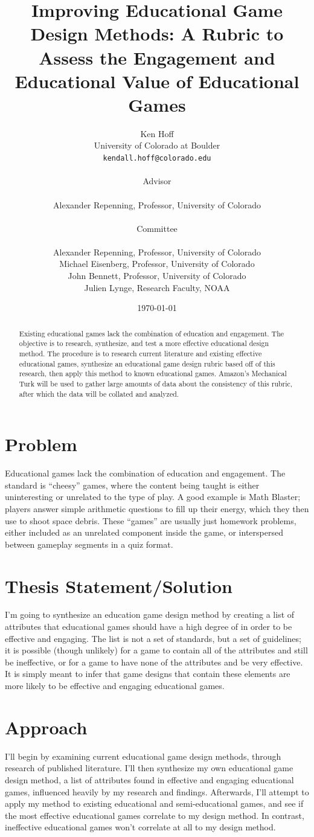 \documentclass[12pt]{report}
\author{Ken Hoff \\ University of Colorado at Boulder \\ \texttt{kendall.hoff@colorado.edu} 
\\ \\ Advisor \\	\\ Alexander Repenning, Professor, University of Colorado 
\\ \\ Committee \\	\\ Alexander Repenning, Professor, University of Colorado
					\\ Michael Eisenberg, Professor, University of Colorado
					\\ John Bennett, Professor, University of Colorado
					\\ Julien Lynge, Research Faculty, NOAA}
\date{\today}
\title{Improving Educational Game Design Methods: A Rubric to Assess the Engagement and Educational Value of Educational Games
}
\begin{document}
\maketitle

\begin{abstract}

Existing educational games lack the combination of education and engagement. The objective is to research, synthesize, and test a more effective educational design method. The procedure is to research current literature and existing effective educational games, synthesize an educational game design rubric based off of this research, then apply this method to known educational games. Amazon's Mechanical Turk will be used to gather large amounts of data about the consistency of this rubric, after which the data will be collated and analyzed.

\end{abstract}

\tableofcontents

\section{Problem}
	Educational games lack the combination of education and engagement. The standard is “cheesy” games, where the content being taught is either uninteresting or unrelated to the type of play. A good example is Math Blaster; players answer simple arithmetic questions to fill up their energy, which they then use to shoot space debris. These “games” are usually just homework problems, either included as an unrelated component inside the game, or interspersed between gameplay segments in a quiz format.

\section{Thesis Statement/Solution}
	I'm going to synthesize an education game design method by creating a list of attributes that educational games should have a high degree of in order to be effective and engaging. The list is not a set of standards, but a set of guidelines; it is possible (though unlikely) for a game to contain all of the attributes and still be ineffective, or for a game to have none of the attributes and be very effective. It is simply meant to infer that game designs that contain these elements are more likely to be effective and engaging educational games.

\section{Approach} 
	I'll begin by examining current educational game design methods, through research of published literature. I'll then synthesize my own educational game design method, a list of attributes found in effective and engaging educational games, influenced heavily by my research and findings. Afterwards, I'll attempt to apply my method to existing educational and semi-educational games, and see if the most effective educational games correlate to my design method. In contrast, ineffective educational games won't correlate at all to my design method.
\end{document}
